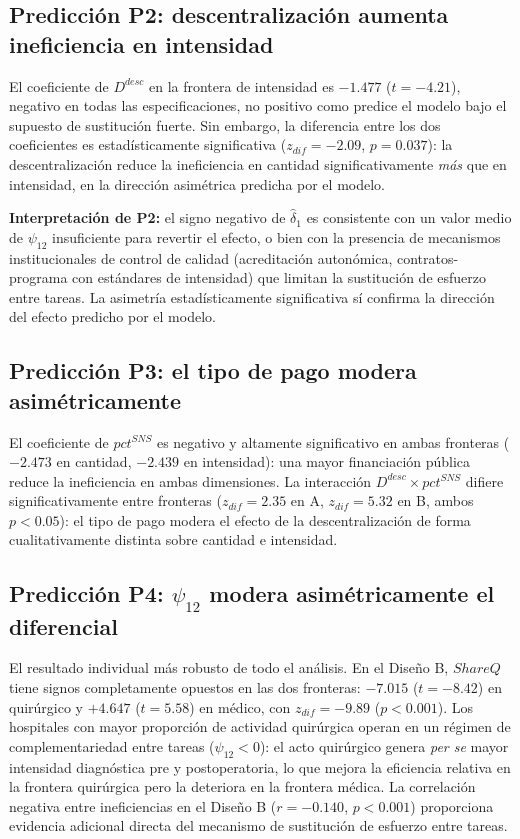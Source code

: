 \documentclass[12pt, a4paper]{article}
\begin{document}
\subsection{Predicción P2: descentralización aumenta ineficiencia en intensidad}

El coeficiente de $D^{desc}$ en la frontera de intensidad es $-1.477$
($t=-4.21$), negativo en todas las especificaciones, no positivo como predice el
modelo bajo el supuesto de sustitución fuerte. Sin embargo, la diferencia entre
los dos coeficientes es estadísticamente significativa ($z_{dif}=-2.09$,
$p=0.037$): la descentralización reduce la ineficiencia en cantidad
significativamente \textit{más} que en intensidad, en la dirección asimétrica
predicha por el modelo.

\begin{cajadestacada}
\textbf{Interpretación de P2:} el signo negativo de $\hat{\delta}_1$ es
consistente con un valor medio de $\psi_{12}$ insuficiente para revertir el
efecto, o bien con la presencia de mecanismos institucionales de control de
calidad (acreditación autonómica, contratos-programa con estándares de
intensidad) que limitan la sustitución de esfuerzo entre tareas. La asimetría
estadísticamente significativa sí confirma la dirección del efecto predicho por
el modelo.
\end{cajadestacada}

\subsection{Predicción P3: el tipo de pago modera asimétricamente}

El coeficiente de $pct^{SNS}$ es negativo y altamente significativo en ambas
fronteras ($-2.473$ en cantidad, $-2.439$ en intensidad): una mayor financiación
pública reduce la ineficiencia en ambas dimensiones. La interacción
$D^{desc}\times pct^{SNS}$ difiere significativamente entre fronteras
($z_{dif}=2.35$ en A, $z_{dif}=5.32$ en B, ambos $p<0.05$): el tipo de pago
modera el efecto de la descentralización de forma cualitativamente distinta
sobre cantidad e intensidad.

\subsection{Predicción P4: $\psi_{12}$ modera asimétricamente el diferencial}

El resultado individual más robusto de todo el análisis. En el Diseño B,
$ShareQ$ tiene signos completamente opuestos en las dos fronteras: $-7.015$
($t=-8.42$) en quirúrgico y $+4.647$ ($t=5.58$) en médico, con
$z_{dif}=-9.89$ ($p<0.001$). Los hospitales con mayor proporción de actividad
quirúrgica operan en un régimen de complementariedad entre tareas ($\psi_{12}<0$):
el acto quirúrgico genera \textit{per se} mayor intensidad diagnóstica pre y
postoperatoria, lo que mejora la eficiencia relativa en la frontera quirúrgica
pero la deteriora en la frontera médica. La correlación negativa entre
ineficiencias en el Diseño B ($r=-0.140$, $p<0.001$) proporciona evidencia
adicional directa del mecanismo de sustitución de esfuerzo entre tareas.
\end{document}
